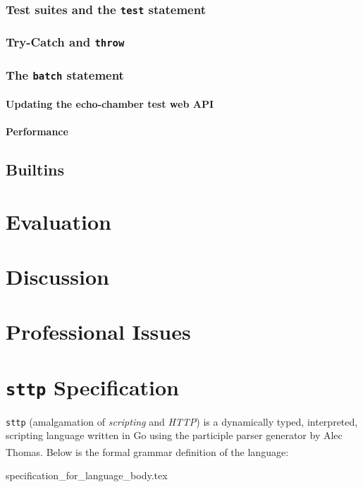 \documentclass[]{full}
\theoremstyle{definition}
\begin{document}
\cprotect\subsection{Test suites and the \verb|test| statement}

\cprotect\subsection{Try-Catch and \verb|throw|}

\cprotect\subsection{The \verb|batch| statement}
\label{sec:eval-ast-nodes-batch}

\subsubsection{Updating the echo-chamber test web API}

\subsubsection{Performance}

\section{Builtins}

\chapter{Evaluation}
\label{chap:evaluation}

\chapter{Discussion}
\label{chap:discussion}

\chapter{Professional Issues}
\label{chap:professional-issues}


\appendix

\cprotect\chapter{\verb|sttp| Specification}
\label{appendix:sttp-specification}

\verb|sttp| (amalgamation of \textit{scripting} and \textit{HTTP}) is a dynamically typed, interpreted, scripting language written in Go using the participle parser generator by Alec Thomas\textsuperscript{\cite{thomas_2021}}. Below is the formal grammar definition of the language:

{specification_for_language_body.tex}

\newpage
\label{endpage}

\printbibliography
\end{document}
